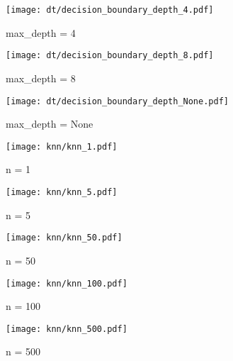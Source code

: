 \documentclass[acmconf,nonacm=true]{acmart}
\begin{document}
\begin{figure}[H]
    \centering
    \texttt{[image: dt/decision\_boundary\_depth\_4.pdf]}
    \caption{max\_depth = 4}
\end{figure}

\begin{figure}[H]
    \centering  
    \texttt{[image: dt/decision\_boundary\_depth\_8.pdf]}
    \caption{max\_depth = 8}
\end{figure}

\begin{figure}[H]
    \centering  
    \texttt{[image: dt/decision\_boundary\_depth\_None.pdf]}
    \caption{max\_depth = None}
\end{figure}

\begin{figure}[H]
    \centering
    \texttt{[image: knn/knn\_1.pdf]}
    \caption{n = 1}
\end{figure}

\begin{figure}[H]
    \centering
    \texttt{[image: knn/knn\_5.pdf]}
    \caption{n = 5}
\end{figure}

\begin{figure}[H]
    \centering
    \texttt{[image: knn/knn\_50.pdf]}
    \caption{n = 50}
\end{figure}

\begin{figure}[H]
    \centering
    \texttt{[image: knn/knn\_100.pdf]}
    \caption{n = 100}
\end{figure}

\begin{figure}[H]
    \centering
    \texttt{[image: knn/knn\_500.pdf]}
    \caption{n = 500}
\end{figure}
\end{document}
